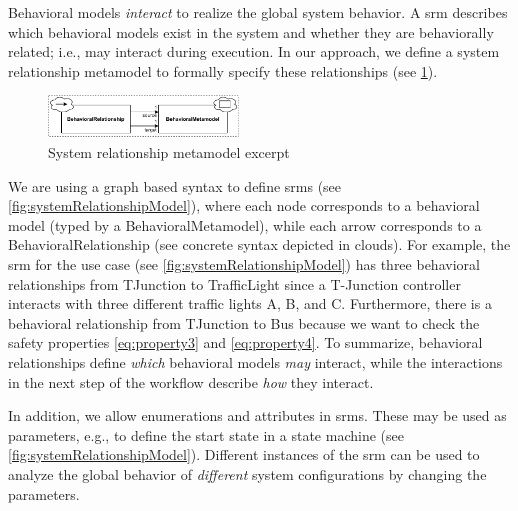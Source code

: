 \documentclass{jot}
\begin{document}
Behavioral models \emph{interact} to realize the global system behavior.
A \gls*{srm} describes which behavioral models exist in the system and whether they are behaviorally related; i.e., may interact during execution.
In our approach, we define a system relationship metamodel to formally specify these relationships (see \cref{fig:srm_metamodel_excerpt}).

\begin{figure}[h]
    \centering
    \includegraphics[width=0.45\textwidth]{figures/srm_metamodel_excerpt.pdf}
    \caption{System relationship metamodel excerpt}
    \label{fig:srm_metamodel_excerpt}
\end{figure}

We are using a graph based syntax to define \gls*{srm}s (see \cref{fig:systemRelationshipModel}), where each node corresponds to a behavioral model (typed by a \textsf{BehavioralMetamodel}), while each arrow corresponds to a \textsf{BehavioralRelationship} (see concrete syntax depicted in clouds).
For example, the \gls*{srm} for the use case (see \cref{fig:systemRelationshipModel}) has three behavioral relationships from \textsf{TJunction} to \textsf{TrafficLight} since a T-Junction controller interacts with three different traffic lights A, B, and C.
Furthermore, there is a behavioral relationship from \textsf{TJunction} to \textsf{Bus} because we want to check the safety properties \eqref{eq:property3} and \eqref{eq:property4}. 
To summarize, behavioral relationships define \textit{which} behavioral models \textit{may} interact, while the interactions in the next step of the workflow describe \textit{how} they interact.

In addition, we allow enumerations and attributes in \gls*{srm}s.
These may be used as parameters, e.g., to define the start state in a state machine (see \cref{fig:systemRelationshipModel}).
Different instances of the \gls*{srm} can be used to analyze the global behavior of \emph{different} system configurations by changing the parameters.
\end{document}
